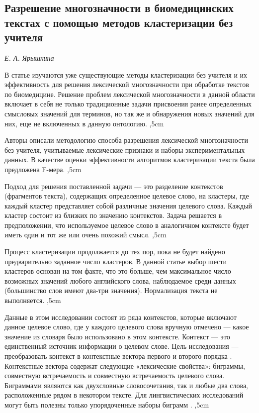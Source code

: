 \documentclass{article}
\begin{document}
\begin{articletext}
\section{Разрешение многозначности в биомедицинских текстах с помощью методов кластеризации без учителя}

\begin{flushright}
\textit{Е. А. Ярышкина} 
\end{flushright}

В статье \cite{Savova 2005} изучаются уже существующие методы кластеризации без учителя и их эффективность для решения лексической многозначности при обработке текстов по биомедицине. Решение проблем лексической многозначности в данной области включает в себя не только традиционные задачи присвоения ранее определенных смысловых значений для терминов, но так же и обнаружения новых значений для них, еще не включенных в данную онтологию.
,5cm

Авторы описали методологию способа разрешения лексической многозначности без учителя, учитываемые лексические признаки и наборы экспериментальных данных. В качестве оценки эффективности алгоритмов кластеризации текста была предложена F-мера. 
,5cm

Подход для решения поставленной задачи --- это разделение контекстов (фрагментов текста), содержащих определенное целевое слово, на кластеры, где каждый кластер представляет собой различные значения целевого слова. Каждый кластер состоит из близких по значению контекстов. Задача решается в предположении, что используемое целевое слово в аналогичном контексте будет иметь один и тот же или очень похожий смысл. 
,5cm

Процесс кластеризации продолжается до тех пор, пока не будет найдено предварительно заданное число кластеров. В данной статье выбор шести кластеров основан на том факте, что это больше, чем максимальное число возможных значений любого английского слова, наблюдаемое среди данных (большинство слов имеют два-три значения). Нормализация текста не выполняется.
,5cm

Данные в этом исследовании состоят из ряда контекстов, которые включают данное целевое слово, где у каждого целевого слова вручную отмечено --- какое значение из словаря было использовано в этом контексте. Контекст --- это единственный источник информации о целевом слове. Цель исследования --- преобразовать контекст в контекстные вектора первого и второго порядка \cite{epr:website}. Контекстные вектора содержат следующие «лексические свойства»: биграммы, совместную встречаемость и совместную встречаемость целевого слова. Биграммами являются как двухсловные словосочетания, так и любые два слова, расположенные рядом в некотором тексте. Для лингвистических исследований могут быть полезны только упорядоченные наборы биграмм \cite{Averin 2006}. 
,5cm


\end{articletext}
\end{document}
